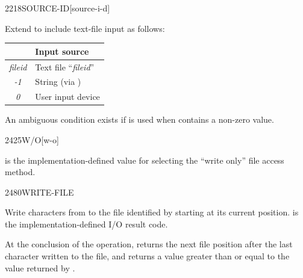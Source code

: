 \begin{worddef}{2218}{SOURCE-ID}[source-i-d]
\item {}

	Extend  to include text-file
	input as follows:
	\begin{center}
	  \begin{tabular}{cl}
		\hline\hline
		\word{SOURCE-ID} & Input source \\
		\hline
		\emph{fileid}	& Text file ``\emph{fileid}'' \\
		\emph{-1}		& String (via \word[core]{EVALUATE}) \\
		\emph{0}		& User input device \\
		\hline\hline
	  \end{tabular}
	\end{center}

	An ambiguous condition exists if  is used when
	 contains a non-zero value.

	\begin{testing} %
	\end{testing}
\end{worddef}


\begin{worddef}{2425}{W/O}[w-o]
\item {}

	 is the implementation-defined value for selecting
	the ``write only'' file access method.

\end{worddef}


\begin{worddef}{2480}{WRITE-FILE}
\item {}

	Write  characters from  to the file
	identified by  starting at its current position.
	 is the implementation-defined I/O result code.

	At the conclusion of the operation,  returns
	the next file position after the last character written to the
	file, and  returns a value greater than or equal
	to the value returned by .

\end{worddef}


